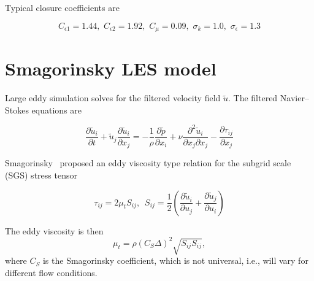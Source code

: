 Typical closure coefficients are

\begin{equation}
    C_{\epsilon 1} = 1.44, \, \,
    C_{\epsilon 2} = 1.92, \, \,
    C_\mu = 0.09, \, \,
    \sigma_k = 1.0, \, \,
    \sigma_\epsilon = 1.3
\end{equation}


\section{Smagorinsky LES model}

Large eddy simulation solves for the filtered velocity field $\tilde{u}$. The
filtered Navier--Stokes equations are

\begin{equation}
    \frac{\partial \tilde{u}_i}{\partial t}
    + \tilde{u}_j \frac{\partial \tilde{u}_i}{\partial x_j}
    = - \frac{1}{\rho} \frac{\partial \tilde{p}}{\partial x_i}
    + \nu \frac{\partial^2 \tilde{u}_i}{\partial x_j \partial x_j}
    - \frac{\partial \tau_{ij}}{\partial x_j}
    \label{eq:filtered-ns}
\end{equation}

Smagorinsky~\cite{Smagorinsky1963} proposed an eddy viscosity type relation for
the subgrid scale (SGS) stress tensor

\begin{equation}
    \tau_{ij} = 2 \mu_t S_{ij}, \, \, \,
    S_{ij} = \frac{1}{2}
    \left(
    \frac{\partial \tilde{u}_i}{\partial u_j}
    + \frac{\partial \tilde{u}_j}{\partial u_i}
    \right)
\end{equation}

The eddy viscosity is then
\begin{equation}
    \mu_t = \rho (C_S \Delta)^2 \sqrt{S_{ij} S_{ij}},
\end{equation}
where $C_S$ is the Smagorinsky coefficient, which is not universal, i.e., will
vary for different flow conditions.
